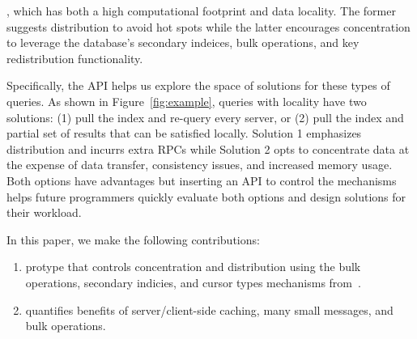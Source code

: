 , which has both a high computational footprint and data locality.
The former suggests distribution to avoid hot spots while the latter encourages
concentration to leverage the database's secondary indeices, bulk operations,
and key redistribution functionality. 

Specifically, the API helps us explore the space of solutions for these types
of queries. As shown in Figure~\ref{fig:example}, queries with locality have
two solutions: (1) pull the index and re-query every server, or (2) pull the
index and partial set of results that can be satisfied locally. Solution 1
emphasizes distribution and incurrs extra RPCs while Solution 2 opts to
concentrate data at the expense of data transfer, consistency issues, and
increased memory usage.  Both options have advantages but inserting an API to
control the mechanisms helps future programmers quickly evaluate both options
and design solutions for their workload.

In this paper, we make the following contributions:

\begin{enumerate}

  \item protype that controls concentration and distribution using the bulk
  operations, secondary indicies, and cursor types mechanisms
  from~\cite{greenberg:hotstorage2015-mdhim}. 

  \item quantifies benefits of server/client-side caching, many small messages,
  and bulk operations.

\end{enumerate}

